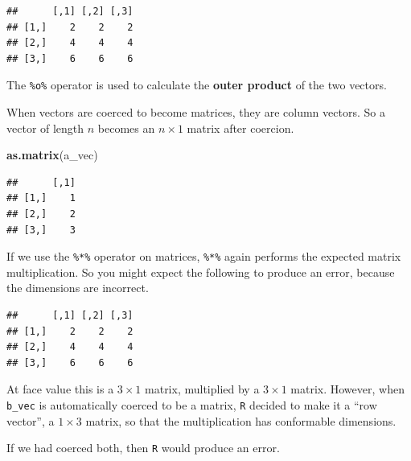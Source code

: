 \documentclass[]{book}
\newenvironment{Shaded}{\begin{snugshade}}{\end{snugshade}}
\newcommand{\KeywordTok}[1]{\textcolor[rgb]{0.13,0.29,0.53}{\textbf{#1}}}
\newcommand{\StringTok}[1]{\textcolor[rgb]{0.31,0.60,0.02}{#1}}
\newcommand{\OperatorTok}[1]{\textcolor[rgb]{0.81,0.36,0.00}{\textbf{#1}}}
\newcommand{\NormalTok}[1]{#1}
\theoremstyle{definition}
\theoremstyle{definition}
\theoremstyle{definition}
\theoremstyle{remark}
\begin{document}
\begin{verbatim}
##      [,1] [,2] [,3]
## [1,]    2    2    2
## [2,]    4    4    4
## [3,]    6    6    6
\end{verbatim}

The \texttt{\%o\%} operator is used to calculate the \textbf{outer
product} of the two vectors.

When vectors are coerced to become matrices, they are column vectors. So
a vector of length \(n\) becomes an \(n \times 1\) matrix after
coercion.

\begin{Shaded}
\begin{Highlighting}[]
\KeywordTok{as.matrix}\NormalTok{(a_vec)}
\end{Highlighting}
\end{Shaded}

\begin{verbatim}
##      [,1]
## [1,]    1
## [2,]    2
## [3,]    3
\end{verbatim}

If we use the \texttt{\%*\%} operator on matrices, \texttt{\%*\%} again
performs the expected matrix multiplication. So you might expect the
following to produce an error, because the dimensions are incorrect.

\begin{Shaded}
\end{Shaded}

\begin{verbatim}
##      [,1] [,2] [,3]
## [1,]    2    2    2
## [2,]    4    4    4
## [3,]    6    6    6
\end{verbatim}

At face value this is a \(3 \times 1\) matrix, multiplied by a
\(3 \times 1\) matrix. However, when \texttt{b\_vec} is automatically
coerced to be a matrix, \texttt{R} decided to make it a ``row vector'',
a \(1 \times 3\) matrix, so that the multiplication has conformable
dimensions.

If we had coerced both, then \texttt{R} would produce an error.

\begin{Shaded}
\end{Shaded}
\end{document}

